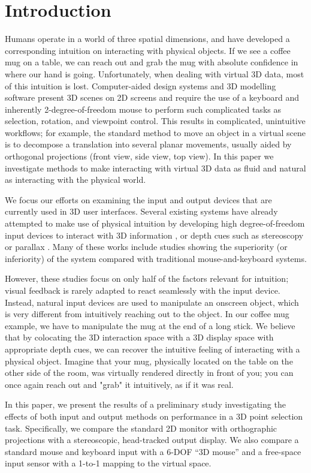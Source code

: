 \section{Introduction}\label{sec:intro}
Humans operate in a world of three spatial dimensions, and have developed a
corresponding intuition on interacting with physical objects.  If we see a
coffee mug on a table, we can reach out and grab the mug with absolute
confidence in where our hand is going. Unfortunately, when dealing with
virtual 3D data, most of this intuition is lost. Computer-aided design systems
and 3D modelling software present 3D scenes on 2D screens and require the use
of a keyboard and inherently 2-degree-of-freedom mouse to perform such
complicated tasks as selection, rotation, and viewpoint control. This results
in complicated, unintuitive workflows; for example, the standard method to
move an object in a virtual scene is to decompose a translation into several
planar movements, usually aided by orthogonal projections (front view, side
view, top view). In this paper we investigate methods to make interacting with
virtual 3D data as fluid and natural as interacting with the physical world.

We focus our efforts on examining the input and output devices that are
currently used in 3D user interfaces. Several existing systems have already
attempted to make use of physical intuition by developing high degree-of-freedom
input devices to interact with 3D information \cite{manders2010gesture,
mattheiss2011navigating,mine1997moving}, or depth cues such as
stereoscopy or parallax \cite{boritz1997study, schultheis2012comparison}.
Many of these works include studies showing the superiority (or inferiority)
of the system compared with traditional mouse-and-keyboard systems.

However, these studies focus on only half of the factors relevant for intuition;
visual feedback is rarely adapted to react seamlessly with the input device.
Instead, natural input devices are used to manipulate an onscreen object, which
is very different from intuitively reaching out to the object. In our coffee
mug example, we have to manipulate the mug at the end of a long stick. We
believe that by colocating the 3D interaction space with a 3D display space
with appropriate depth cues, we can recover the intuitive feeling of interacting
with a physical object. Imagine that your mug, physically located on the table
on the other side of the room, was virtually rendered directly in front of you;
you can once again reach out and "grab" it intuitively, as if it was real.

In this paper, we present the results of a preliminary study investigating the
effects of both input and output methods on performance in a 3D point selection
task. Specifically, we compare the standard 2D monitor with orthographic
projections with a stereoscopic, head-tracked output display. We also compare a
standard mouse and keyboard input with a 6-DOF ``3D mouse'' and a free-space
input sensor with a 1-to-1 mapping to the virtual space.

